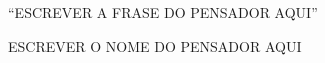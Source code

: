 \begin{epigrafe}
    \vspace*{\fill}
    
	\hspace{.45\textwidth}
	\begin{minipage}{.5\textwidth}
		``ESCREVER A FRASE DO PENSADOR AQUI''
			
		\begin{flushright}			
			ESCREVER O NOME DO PENSADOR AQUI
		\end{flushright}
	\end{minipage}%
\end{epigrafe}